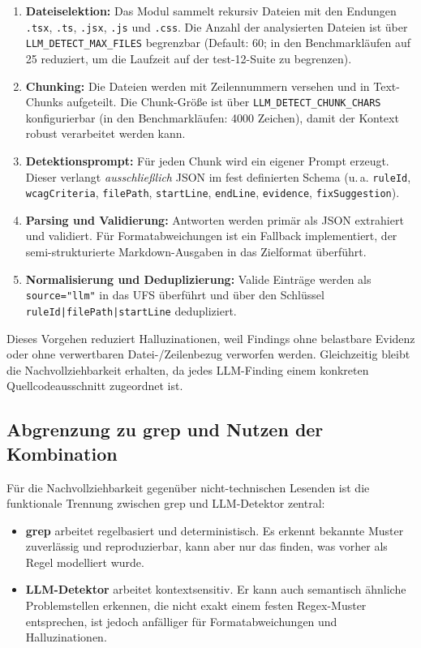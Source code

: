 \begin{enumerate}
  \item \textbf{Dateiselektion:} Das Modul sammelt rekursiv Dateien mit den Endungen \texttt{.tsx}, \texttt{.ts}, \texttt{.jsx}, \texttt{.js} und \texttt{.css}. Die Anzahl der analysierten Dateien ist über \texttt{LLM\_DETECT\_MAX\_FILES} begrenzbar (Default: 60; in den Benchmarkläufen auf 25 reduziert, um die Laufzeit auf der test-12-Suite zu begrenzen).
  \item \textbf{Chunking:} Die Dateien werden mit Zeilennummern versehen und in Text-Chunks aufgeteilt. Die Chunk-Größe ist über \texttt{LLM\_DETECT\_CHUNK\_CHARS} konfigurierbar (in den Benchmarkläufen: 4000 Zeichen), damit der Kontext robust verarbeitet werden kann.
  \item \textbf{Detektionsprompt:} Für jeden Chunk wird ein eigener Prompt erzeugt. Dieser verlangt \textit{ausschließlich} JSON im fest definierten Schema (u.\,a. \texttt{ruleId}, \texttt{wcagCriteria}, \texttt{filePath}, \texttt{startLine}, \texttt{endLine}, \texttt{evidence}, \texttt{fixSuggestion}).
  \item \textbf{Parsing und Validierung:} Antworten werden primär als JSON extrahiert und validiert. Für Formatabweichungen ist ein Fallback implementiert, der semi-strukturierte Markdown-Ausgaben in das Zielformat überführt.
  \item \textbf{Normalisierung und Deduplizierung:} Valide Einträge werden als \texttt{source="llm"} in das \ac{UFS} überführt und über den Schlüssel \texttt{ruleId|filePath|startLine} dedupliziert.
\end{enumerate}

Dieses Vorgehen reduziert Halluzinationen, weil Findings ohne belastbare Evidenz oder ohne verwertbaren Datei-/Zeilenbezug verworfen werden. Gleichzeitig bleibt die Nachvollziehbarkeit erhalten, da jedes LLM-Finding einem konkreten Quellcodeausschnitt zugeordnet ist.

\subsection{Abgrenzung zu grep und Nutzen der Kombination}

Für die Nachvollziehbarkeit gegenüber nicht-technischen Lesenden ist die funktionale Trennung zwischen grep und LLM-Detektor zentral:

\begin{itemize}
  \item \textbf{grep} arbeitet regelbasiert und deterministisch. Es erkennt bekannte Muster zuverlässig und reproduzierbar, kann aber nur das finden, was vorher als Regel modelliert wurde.
  \item \textbf{LLM-Detektor} arbeitet kontextsensitiv. Er kann auch semantisch ähnliche Problemstellen erkennen, die nicht exakt einem festen Regex-Muster entsprechen, ist jedoch anfälliger für Formatabweichungen und Halluzinationen.
\end{itemize}


